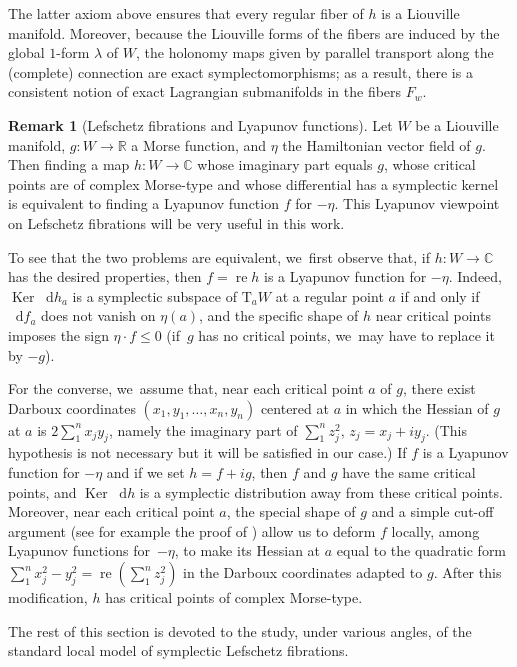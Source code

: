 \documentclass[JEP,XML,SOM,Unicode]{cedram}
\newcommand{\C}{{\mathbb C}}
\newcommand{\R}{{\mathbb R}}
\newcommand{\re}{\operatorname{re}}
\newcommand{\Ker}{\operatorname{Ker}}
\newcommand{\etc}{,\ldots,}
\newcommand{\rT}{\mathrm{T}}
\renewcommand{\d}{\mathop{}\!\mathrm d}
\newcommand{\df}{\d f}
\renewcommand{\dh}{\d h}
\let\on\colon
\theoremstyle{plain}
\theoremstyle{definition}
\newtheorem{remark}[theorem]{Remark}
\begin{document}
The latter axiom above ensures that every regular fiber of $h$ is a Liouville
manifold. Moreover, because the Liouville forms of the fibers are induced by the
global $1$-form $\lambda$ of $W$, the holonomy maps given by parallel transport
along the (complete) connection are exact symplectomorphisms; as a result, there
is a consistent notion of exact Lagrangian submanifolds in the fibers $F_w$.

\begin{remark}[Lefschetz fibrations and Lyapunov functions] \label{r:lyap}
Let $W$ be a Liouville manifold, $g \on W \to \R$ a Morse function, and $\eta$
the Hamiltonian vector field of $g$. Then finding a map $h \on W \to \C$ whose
imaginary part equals $g$, whose critical points are of complex Morse-type and
whose differential has a symplectic kernel is equivalent to finding a Lyapunov
function $f$ for $-\eta$. This Lyapunov viewpoint on Lefschetz fibrations will
be very useful in this work.

To see that the two problems are equivalent, we~first observe that, if $h \on W
\to \C$ has the desired properties, then $f = \re h$ is a Lyapunov function for
$-\eta$. Indeed, $\Ker \dh_a$ is a symplectic subspace of $\rT_aW$ at a regular
point $a$ if and only if $\df_a$ does not vanish on $\eta(a)$, and the specific
shape of $h$ near critical points imposes the sign $\eta \cdot f \le 0$ (if~$g$
has no critical points, we~may have to replace it by $-g$).

For the converse, we~assume that, near each critical point $a$ of $g$, there
exist Darboux coordinates $(x_1, y_1 \etc x_n, y_n)$ centered at $a$ in which
the Hessian of $g$ at $a$ is $2 \sum_1^n x_jy_j$, namely the imaginary part of
$\sum_1^n z_j^2$, $z_j = x_j+iy_j$. (This hypothesis is not necessary but it
will be satisfied in our case.) If $f$ is a Lyapunov function for $-\eta$ and if
we set $h = f+ig$, then $f$ and $g$ have the same critical points, and $\Ker\dh$
is a symplectic distribution away from these critical points. Moreover, near
each critical point $a$, the special shape of $g$ and a simple cut-off argument
(see for example the proof of \cite[Lem.\,6.6]{GP}) allow us to deform $f$
locally, among Lyapunov functions for~$-\eta$, to make its Hessian at $a$ equal
to the quadratic form $\sum_1^n x_j^2-y_j^2 = \re \left(\sum_1^n z_j^2\right)$
in the Darboux coordinates adapted to $g$. After this modification, $h$ has
critical points of complex Morse-type.
\end{remark}

The rest of this section is devoted to the study, under various angles, of the
standard local model of symplectic Lefschetz fibrations.
\end{document}
